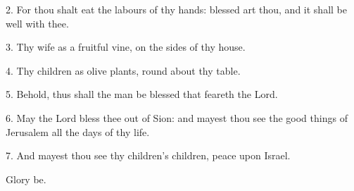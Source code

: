 
2. For thou shalt eat the labours of thy hands: blessed art thou, and it shall be well with thee.

3. Thy wife as a fruitful vine, on the sides of thy house.

4. Thy children as olive plants, round about thy table.

5. Behold, thus shall the man be blessed that feareth the Lord.

6. May the Lord bless thee out of Sion: and mayest thou see the good things of Jerusalem all the days of thy life.

7. And mayest thou see thy children's children, peace upon Israel.

Glory be.